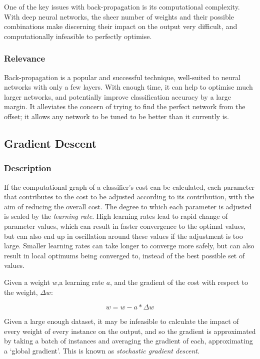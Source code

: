 One of the key issues with back-propagation is its computational complexity. With deep neural networks, the sheer number of weights and their possible combinations make discerning their impact on the output very difficult, and computationally infeasible to perfectly optimise.

\subsubsection{Relevance}
Back-propagation is a popular and successful technique, well-suited to neural networks with only a few layers. With enough time, it can help to optimise much larger networks, and potentially improve classification accuracy by a large margin. It alleviates the concern of trying to find the perfect network from the offset; it allows any network to be tuned to be better than it currently is.

\subsection{Gradient Descent}\label{lit:grad_desc}
\subsubsection{Description}
If the computational graph of a classifier's cost can be calculated, each parameter that contributes to the cost to be adjusted according to its contribution, with the aim of reducing the overall cost. The degree to which each parameter is adjusted is scaled by the \textit{learning rate}. High learning rates lead to rapid change of parameter values, which can result in faster convergence to the optimal values, but can also end up in oscillation around these values if the adjustment is too large. Smaller learning rates can take longer to converge more safely, but can also result in local optimums being converged to, instead of the best possible set of values.

Given a weight $w$,a learning rate $a$, and the gradient of the cost with respect to the weight, $\Delta w$:

\[w = w - a*\Delta w\]

Given a large enough dataset, it may be infeasible to calculate the impact of every weight of every instance on the output, and so the gradient is approximated by taking a batch of instances and averaging the gradient of each, approximating a `global gradient'. This is known as \textit{stochastic gradient descent}\cite{bottou2010large}.


